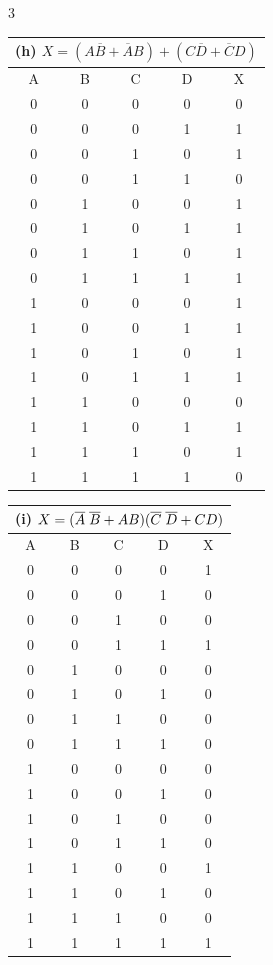 \documentclass[a4paper]{article}
\begin{document}
\begin{multicols}{3}
\begin{tabular}{|c|c|c|c||c|}
\multicolumn{5}{|c|}{(h) $X = (A\overline{B} + \overline{A}B) + (C\overline{D} + \overline{C}D)$} \\ \hline
A & B & C & D & X \\ \hline
0 & 0 & 0 & 0 & 0 \\ \hline
0 & 0 & 0 & 1 & 1 \\ \hline
0 & 0 & 1 & 0 & 1 \\ \hline
0 & 0 & 1 & 1 & 0 \\ \hline
0 & 1 & 0 & 0 & 1 \\ \hline
0 & 1 & 0 & 1 & 1 \\ \hline
0 & 1 & 1 & 0 & 1 \\ \hline
0 & 1 & 1 & 1 & 1 \\ \hline
1 & 0 & 0 & 0 & 1 \\ \hline
1 & 0 & 0 & 1 & 1 \\ \hline
1 & 0 & 1 & 0 & 1 \\ \hline
1 & 0 & 1 & 1 & 1 \\ \hline
1 & 1 & 0 & 0 & 0 \\ \hline
1 & 1 & 0 & 1 & 1 \\ \hline
1 & 1 & 1 & 0 & 1 \\ \hline
1 & 1 & 1 & 1 & 0 \\ \hline
\end{tabular}

\begin{tabular}{|c|c|c|c||c|}
\multicolumn{5}{|c|}{(i) $X = (\overline{A}\hspace{0.1cm}\overline{B} + AB)(\overline{C}\hspace{0.1cm}\overline{D} + CD)$} \\ \hline
A & B & C & D & X \\ \hline
0 & 0 & 0 & 0 & 1 \\ \hline
0 & 0 & 0 & 1 & 0 \\ \hline
0 & 0 & 1 & 0 & 0 \\ \hline
0 & 0 & 1 & 1 & 1 \\ \hline
0 & 1 & 0 & 0 & 0 \\ \hline
0 & 1 & 0 & 1 & 0 \\ \hline
0 & 1 & 1 & 0 & 0 \\ \hline
0 & 1 & 1 & 1 & 0 \\ \hline
1 & 0 & 0 & 0 & 0 \\ \hline
1 & 0 & 0 & 1 & 0 \\ \hline
1 & 0 & 1 & 0 & 0 \\ \hline
1 & 0 & 1 & 1 & 0 \\ \hline
1 & 1 & 0 & 0 & 1 \\ \hline
1 & 1 & 0 & 1 & 0 \\ \hline
1 & 1 & 1 & 0 & 0 \\ \hline
1 & 1 & 1 & 1 & 1 \\ \hline
\end{tabular}


\end{multicols}
\end{document}
